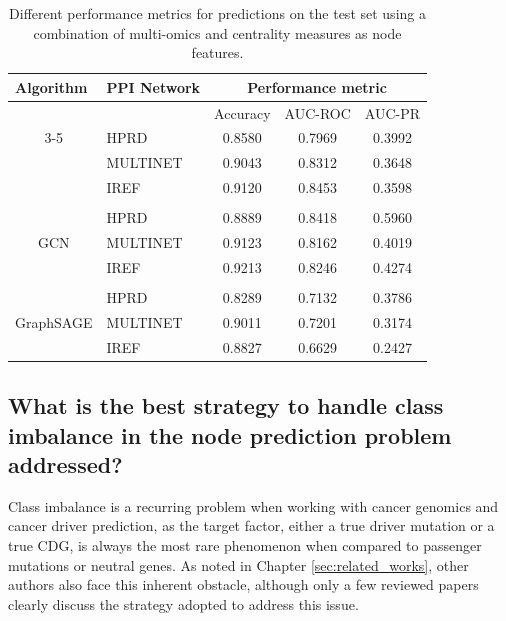 \begin{table}[!th]
\centering
\caption{Different performance metrics for predictions on the test set using a combination of multi-omics and centrality measures as node features. \label{tab:results1_metrics_comparison}}
\begin{tabular}{clccc}
\hline
\multicolumn{1}{l}{Algorithm} & PPI Network & \multicolumn{3}{c}{Performance metric} \\ \hline
\multicolumn{1}{l}{}          &             & Accuracy     & AUC-ROC     & AUC-PR    \\ \cline{3-5} 
\multirow{3}{*}{GAT}          & HPRD        & 0.8580       & 0.7969      & 0.3992    \\
                              & MULTINET    & 0.9043       & 0.8312      & 0.3648    \\
                              & IREF        & 0.9120       & 0.8453      & 0.3598    \\
\multicolumn{1}{l}{}          &             &              &             &           \\
\multirow{3}{*}{GCN}          & HPRD        & 0.8889       & 0.8418      & 0.5960    \\
                              & MULTINET    & 0.9123       & 0.8162      & 0.4019    \\
                              & IREF        & 0.9213       & 0.8246      & 0.4274    \\
\multicolumn{1}{l}{}          &             &              &             &           \\
\multirow{3}{*}{GraphSAGE}    & HPRD        & 0.8289       & 0.7132      & 0.3786    \\
                              & MULTINET    & 0.9011       & 0.7201      & 0.3174    \\
                              & IREF        & 0.8827       & 0.6629      & 0.2427    \\ \hline
\end{tabular}
\end{table}

\subsection{What is the best strategy to handle class imbalance in the node prediction problem addressed?}
\label{sec:results:comparative_evaluation:rq3}

Class imbalance is a recurring problem when working with cancer genomics and cancer driver prediction, as the target factor, either a true driver mutation or a true CDG, is always the most rare phenomenon when compared to passenger mutations or neutral genes. As noted in Chapter \ref{sec:related_works}, other authors also face this inherent obstacle, although only a few reviewed papers clearly discuss the strategy adopted to address this issue.



